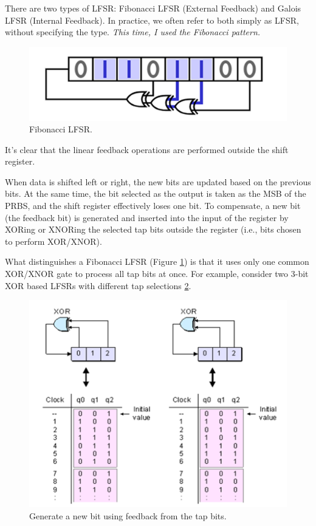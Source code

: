 There are two types of LFSR: Fibonacci LFSR (External Feedback) and Galois LFSR (Internal Feedback). In practice, we often refer to both simply as LFSR, without specifying the type. \textit{This time, I used the Fibonacci pattern.}

\begin{figure}[H]
	\centering
	\includegraphics[width=.7\linewidth]{./my-chapters/my-images/theoretical_background/LFSR_Fibonacci.png}
	\caption{Fibonacci LFSR.}
	\label{fig: fibonacci lfsr}
\end{figure}

It's clear that the linear feedback operations are performed outside the shift register.

When data is shifted left or right, the new bits are updated based on the previous bits. At the same time, the bit selected as the output is taken as the MSB of the PRBS, and the shift register effectively loses one bit.
To compensate, a new bit (the feedback bit) is generated and inserted into the input of the register by XORing or XNORing the selected tap bits outside the register (i.e., bits chosen to perform XOR/XNOR).

What distinguishes a Fibonacci LFSR (Figure \ref{fig: fibonacci lfsr}) is that it uses only one common XOR/XNOR gate to process all tap bits at once. For example, consider two 3-bit XOR based LFSRs with different tap selections \ref{fig: lfsr_feedback}.

\begin{figure}[H]
	\centering
	\includegraphics[width=.8\linewidth]{./my-chapters/my-images/theoretical_background/LFSR_feedback.png}
	\caption{Generate a new bit using feedback from the tap bits.}
	\label{fig: lfsr_feedback}
\end{figure}

